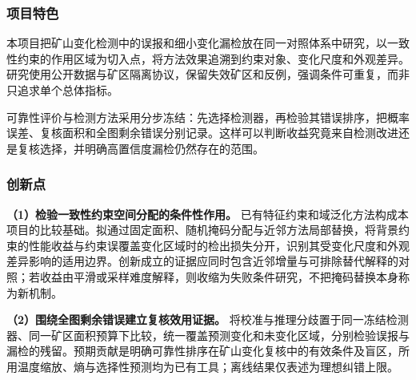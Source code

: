 \justifying
\NSFCBodyText

\subsubsection{项目特色}
本项目把矿山变化检测中的误报和细小变化漏检放在同一对照体系中研究，以一致性约束的作用区域为切入点，将方法效果追溯到约束对象、变化尺度和外观差异。研究使用公开数据与矿区隔离协议，保留失效矿区和反例，强调条件可重复，而非只追求单个总体指标。

可靠性评价与检测方法采用分步冻结：先选择检测器，再检验其错误排序，把概率误差、复核面积和全图剩余错误分别记录。这样可以判断收益究竟来自检测改进还是复核选择，并明确高置信度漏检仍然存在的范围。

\subsubsection{创新点}
\textbf{（1）检验一致性约束空间分配的条件性作用。}
已有特征约束和域泛化方法构成本项目的比较基础。拟通过固定面积、随机掩码分配与近邻方法局部替换，将背景约束的性能收益与约束误覆盖变化区域时的检出损失分开，识别其受变化尺度和外观差异影响的适用边界。创新成立的证据应同时包含近邻增量与可排除替代解释的对照；若收益由平滑或采样难度解释，则收缩为失败条件研究，不把掩码替换本身称为新机制。

\textbf{（2）围绕全图剩余错误建立复核效用证据。}
将校准与推理分歧置于同一冻结检测器、同一矿区面积预算下比较，统一覆盖预测变化和未变化区域，分别检验误报与漏检的残留。预期贡献是明确可靠性排序在矿山变化复核中的有效条件及盲区，所用温度缩放、熵与选择性预测均为已有工具；离线结果仅表述为理想纠错上限。
